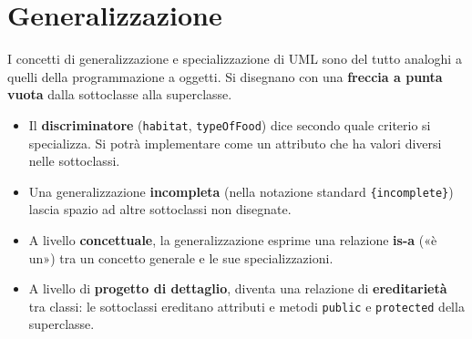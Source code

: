 \section{Generalizzazione}

I concetti di generalizzazione e specializzazione di UML sono del tutto analoghi a quelli della programmazione a oggetti.
Si disegnano con una \textbf{freccia a punta vuota} dalla sottoclasse alla superclasse.

\begin{center}
\end{center}

\begin{itemize}
  \item Il \textbf{discriminatore} (\texttt{habitat}, \texttt{typeOfFood}) dice secondo quale criterio si specializza. Si potrà
        implementare come un attributo che ha valori diversi nelle sottoclassi.
  \item Una generalizzazione \textbf{incompleta} (nella notazione standard \texttt{\{incomplete\}}) lascia spazio ad altre
        sottoclassi non disegnate.
  \item A livello \textbf{concettuale}, la generalizzazione esprime una relazione \textbf{is-a} («è un») tra un concetto generale
        e le sue specializzazioni.
  \item A livello di \textbf{progetto di dettaglio}, diventa una relazione di \textbf{ereditarietà} tra classi: le sottoclassi
        ereditano attributi e metodi \texttt{public} e \texttt{protected} della superclasse.
\end{itemize}

